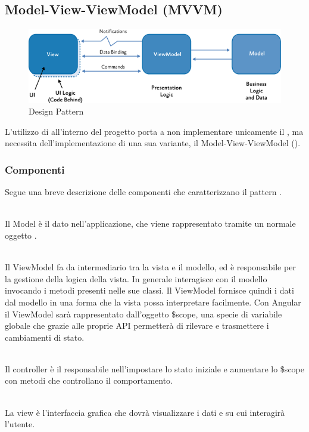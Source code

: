 \documentclass[a4paper, titlepage]{article}
\begin{document}
\subsection{Model-View-ViewModel (MVVM)}
\begin{figure}[htp]
\centering
\includegraphics[scale=0.50]{Img/MVVM.png}
\caption{Design Pattern }
\label{} 
\end{figure}
L'utilizzo di  all'interno del progetto porta a non implementare unicamente il  , ma 
necessita dell'implementazione di una sua variante, il Model-View-ViewModel ().

\subsubsection{Componenti}
Segue una breve descrizione delle componenti che caratterizzano il pattern .

\begin{description}
\item{} 
\\ Il Model è il dato nell’applicazione, che viene rappresentato tramite un normale oggetto .
\item{}
\\ Il ViewModel fa da intermediario tra la vista e il modello, ed è responsabile per la gestione della logica della vista. In generale interagisce con il modello invocando i metodi presenti nelle sue classi.
Il ViewModel fornisce quindi i dati dal modello in una forma che la vista possa interpretare facilmente.
\newline Con Angular il ViewModel sarà rappresentato dall’oggetto \$scope, una specie di variabile globale  che grazie alle proprie API permetterà di rilevare e trasmettere i cambiamenti di stato.
\item{}
\\ Il controller è il responsabile nell’impostare lo stato iniziale e aumentare lo \$scope con metodi che controllano il comportamento.
\item{}
\\ La view è l’interfaccia grafica che dovrà visualizzare i dati e su cui interagirà l'utente.
\end{description}
\end{document}
